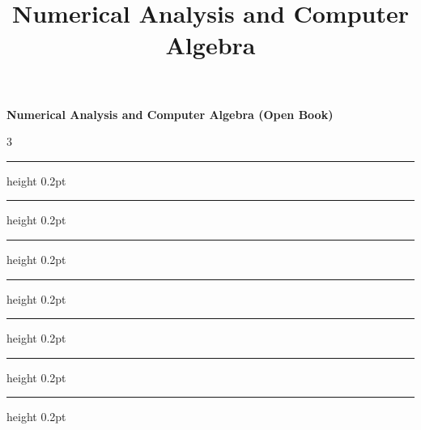 \documentclass[10pt,landscape]{article}
\title{Numerical Analysis and Computer Algebra}
\renewcommand{\hrulefill}{\leavevmode\leaders\hrule height 0.2pt \hfill\kern0pt\relax}
\begin{document}
    \raggedright
    \footnotesize

    \begin{center}
        \textbf{Numerical Analysis and Computer Algebra (Open Book)} \\
    \end{center}
    \begin{multicols}{3}
        \setlength{\premulticols}{1pt}
        \setlength{\postmulticols}{1pt}
        \setlength{\multicolsep}{1pt}
        \setlength{\columnsep}{2pt}

        

        \hrulefill
        \hspace{.5cm}

        

        \hrulefill
        \hspace{.5cm}

        

        \hrulefill
        \hspace{.5cm}

        

        \hrulefill
        \hspace{.5cm}

        

        \hrulefill
        \hspace{.5cm}

        

        \hrulefill
        \hspace{.5cm}

        

        \hrulefill
        \hspace{.5cm}

        \newpage
        
    \end{multicols}
\end{document}
